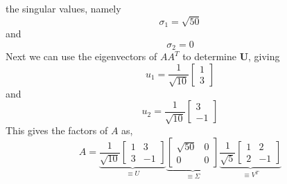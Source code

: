\begin{enumerate}[label=\arabic*.]
\begin{mdframed}[style=MyFrame]
            the singular values, namely 
            \begin{equation}
                \sigma_{1} =  \sqrt{50}
            \end{equation}
            and
            \begin{equation}
                \sigma_{2}  = 0 
            \end{equation}
            Next we can use the eigenvectors of $AA^{T}$ to determine
            $\mathbf{U}$, giving
            \begin{equation}
                u_{1} = 
                \frac{1}{\sqrt{10}}
                \begin{bmatrix}
                    1       \\
                    3
                \end{bmatrix}
            \end{equation}
            and
            \begin{equation}
                u_{2} =
                \frac{1}{\sqrt{10}}
                \begin{bmatrix}
                    3       \\
                    -1
                \end{bmatrix}
            \end{equation}
            This gives the factors of $A$ as,
            \begin{equation}
                A = 
                \underbrace{
                    \frac{1}{\sqrt{10}}
                    \begin{bmatrix}
                        1       &       3       \\
                        3       &       -1
                    \end{bmatrix}
                }_{\equiv U}
                \underbrace{
                    \begin{bmatrix}
                        \sqrt{50}       &       0       \\
                        0               &       0
                    \end{bmatrix}
                }_{\equiv \Sigma}
                \underbrace{
                    \frac{1}{\sqrt{5}}
                    \begin{bmatrix}
                        1               &       2       \\
                        2               &       -1
                    \end{bmatrix}
                }_{\equiv V^{T}}
            \end{equation}
        \end{mdframed}
        

\end{enumerate}
